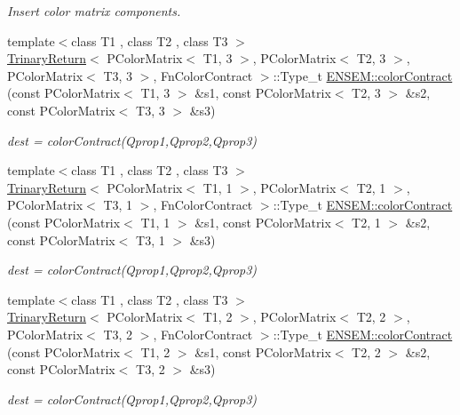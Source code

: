 \begin{DoxyCompactItemize}
\begin{DoxyCompactList}\small\item\em Insert color matrix components. \end{DoxyCompactList}\item 
{\footnotesize template$<$class T1 , class T2 , class T3 $>$ }\\\mbox{\hyperlink{structTrinaryReturn}{Trinary\+Return}}$<$ P\+Color\+Matrix$<$ T1, 3 $>$, P\+Color\+Matrix$<$ T2, 3 $>$, P\+Color\+Matrix$<$ T3, 3 $>$, Fn\+Color\+Contract $>$\+::Type\+\_\+t \mbox{\hyperlink{group__primcolormatrix_ga200705dac956b2d421ea1793fdb916b9}{E\+N\+S\+E\+M\+::color\+Contract}} (const P\+Color\+Matrix$<$ T1, 3 $>$ \&s1, const P\+Color\+Matrix$<$ T2, 3 $>$ \&s2, const P\+Color\+Matrix$<$ T3, 3 $>$ \&s3)
\begin{DoxyCompactList}\small\item\em dest = color\+Contract(\+Qprop1,\+Qprop2,\+Qprop3) \end{DoxyCompactList}\item 
{\footnotesize template$<$class T1 , class T2 , class T3 $>$ }\\\mbox{\hyperlink{structTrinaryReturn}{Trinary\+Return}}$<$ P\+Color\+Matrix$<$ T1, 1 $>$, P\+Color\+Matrix$<$ T2, 1 $>$, P\+Color\+Matrix$<$ T3, 1 $>$, Fn\+Color\+Contract $>$\+::Type\+\_\+t \mbox{\hyperlink{group__primcolormatrix_ga89c3eb4b75063bbb9022ef9b699765dd}{E\+N\+S\+E\+M\+::color\+Contract}} (const P\+Color\+Matrix$<$ T1, 1 $>$ \&s1, const P\+Color\+Matrix$<$ T2, 1 $>$ \&s2, const P\+Color\+Matrix$<$ T3, 1 $>$ \&s3)
\begin{DoxyCompactList}\small\item\em dest = color\+Contract(\+Qprop1,\+Qprop2,\+Qprop3) \end{DoxyCompactList}\item 
{\footnotesize template$<$class T1 , class T2 , class T3 $>$ }\\\mbox{\hyperlink{structTrinaryReturn}{Trinary\+Return}}$<$ P\+Color\+Matrix$<$ T1, 2 $>$, P\+Color\+Matrix$<$ T2, 2 $>$, P\+Color\+Matrix$<$ T3, 2 $>$, Fn\+Color\+Contract $>$\+::Type\+\_\+t \mbox{\hyperlink{group__primcolormatrix_gacaff55b3cd1b6aafb43249af3ac16ea9}{E\+N\+S\+E\+M\+::color\+Contract}} (const P\+Color\+Matrix$<$ T1, 2 $>$ \&s1, const P\+Color\+Matrix$<$ T2, 2 $>$ \&s2, const P\+Color\+Matrix$<$ T3, 2 $>$ \&s3)
\begin{DoxyCompactList}\small\item\em dest = color\+Contract(\+Qprop1,\+Qprop2,\+Qprop3) \end{DoxyCompactList}\item 

\end{DoxyCompactItemize}

